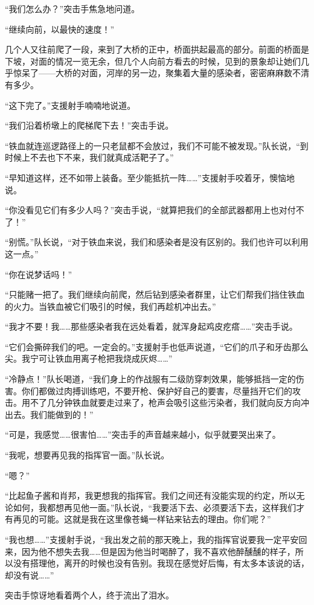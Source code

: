 “我们怎么办？”突击手焦急地问道。

“继续向前，以最快的速度！”

几个人又往前爬了一段，来到了大桥的正中，桥面拱起最高的部分。前面的桥面是下坡，对面的情况一览无余，但几个人向前方看去的时候，见到的景象却让她们几乎惊呆了——大桥的对面，河岸的另一边，聚集着大量的感染者，密密麻麻数不清有多少。

“这下完了。”支援射手喃喃地说道。

“我们沿着桥墩上的爬梯爬下去！”突击手说。

“铁血就连巡逻路径上的一只老鼠都不会放过，我们不可能不被发现。”队长说，“到时候上不去也下不来，我们就真成活靶子了。”

“早知道这样，还不如带上装备。至少能抵抗一阵……”支援射手咬着牙，懊恼地说。

“你没看见它们有多少人吗？”突击手说，“就算把我们的全部武器都用上也对付不了！”

“别慌。”队长说，“对于铁血来说，我们和感染者是没有区别的。我们也许可以利用这一点。”

“你在说梦话吗！”

“只能赌一把了。我们继续向前爬，然后钻到感染者群里，让它们帮我们挡住铁血的火力。当铁血被它们吸引的时候，我们再趁机冲出去。”

“我才不要！我……那些感染者我在远处看着，就浑身起鸡皮疙瘩……”突击手说。

“它们会撕碎我们的吧。一定会的。”支援射手也低声说道，“它们的爪子和牙齿那么尖。我宁可让铁血用离子枪把我烧成灰烬……”

“冷静点！”队长喝道，“我们身上的作战服有二级防穿刺效果，能够抵挡一定的伤害。你们都做过肉搏训练吧，不要开枪、保护好自己的要害，尽量挡开它们的攻击。用不了几分钟铁血就要走过来了，枪声会吸引这些污染者，我们就向反方向冲出去。我们能做到的！”

“可是，我感觉……很害怕……”突击手的声音越来越小，似乎就要哭出来了。

“我呢，想要再见我的指挥官一面。”队长说。

“嗯？”

“比起鱼子酱和肖邦，我更想我的指挥官。我们之间还有没能实现的约定，所以无论如何，我都想再见他一面。”队长说，“我要活下去、必须要活下去，这样我们才有再见的可能。这就是我在这里像苍蝇一样钻来钻去的理由。你们呢？”

“我也想……”支援射手说，“我出发之前的那天晚上，我的指挥官说要我一定平安回来，因为他不想失去我……但是因为他当时喝醉了，我不喜欢他醉醺醺的样子，所以没有搭理他，离开的时候也没有告别。我现在感觉好后悔，有太多本该说的话，却没有说……”

突击手惊讶地看着两个人，终于流出了泪水。

